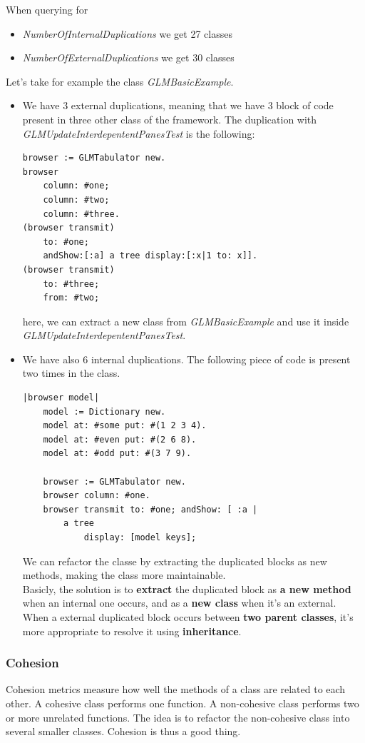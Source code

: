 \documentclass[11pt,a4paper]{article}
\begin{document}
When querying for
\begin{itemize}
\item \textit{NumberOfInternalDuplications} we get 27 classes
\item \textit{NumberOfExternalDuplications} we get 30 classes
\end{itemize}
Let's take for example the class \textit{GLMBasicExample}.
\begin{itemize}
\item We have 3 external duplications, meaning that we have 3 block of code present in three other class of the framework. The duplication with \textit{GLMUpdateInterdepententPanesTest} is the following:
\begin{lstlisting}
browser := GLMTabulator new.
browser
	column: #one;
	column: #two;
	column: #three.
(browser transmit)
	to: #one;
	andShow:[:a] a tree display:[:x|1 to: x]].
(browser transmit)
	to: #three;
	from: #two;
\end{lstlisting}
here, we can extract a new class from \textit{GLMBasicExample} and use it inside \textit{GLMUpdateInterdepententPanesTest}.

\item We have also 6 internal duplications. The following piece of code is present two times in the class.
\begin{lstlisting}
|browser model|
	model := Dictionary new.
	model at: #some put: #(1 2 3 4).
	model at: #even put: #(2 6 8).
	model at: #odd put: #(3 7 9).
	
	browser := GLMTabulator new.
	browser column: #one.
	browser transmit to: #one; andShow: [ :a |
		a tree
			display: [model keys];  
\end{lstlisting}

We can refactor the classe by extracting the duplicated blocks as new methods, making the class more maintainable.\\

Basicly, the solution is to \textbf{extract} the duplicated block as \textbf{a new method} when  an internal one occurs, and as a \textbf{new class} when it's an external. When a external duplicated block occurs between \textbf{two parent classes}, it's more appropriate to resolve it using \textbf{inheritance}. 
\end{itemize}	
\subsubsection{Cohesion}
Cohesion metrics measure how well the methods of a class are related to each other. A cohesive class performs one function. A non-cohesive class performs two or more unrelated functions. The idea is to refactor the non-cohesive class into several smaller classes. Cohesion is thus a good thing.
\end{document}
